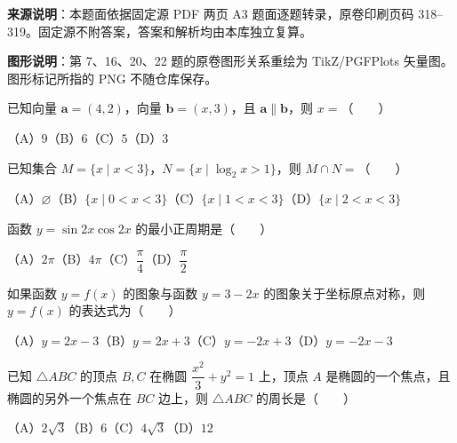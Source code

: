


\begin{gktip}
\textbf{来源说明}：本题面依据固定源 PDF 两页 A3 题面逐题转录，原卷印刷页码 318–319。固定源不附答案，答案和解析均由本库独立复算。

\textbf{图形说明}：第 7、16、20、22 题的原卷图形关系重绘为 TikZ/PGFPlots 矢量图。图形标记所指的 PNG 不随仓库保存。
\end{gktip}


\begin{question}
已知向量 $\boldsymbol a=(4,2)$，向量 $\boldsymbol b=(x,3)$，且 $\boldsymbol a\parallel\boldsymbol b$，则 $x=$\mbox{（　　）}

（A）$9$\quad（B）$6$\quad（C）$5$\quad（D）$3$

\end{question}
\begin{question}
已知集合 $M=\{x\mid x<3\}$，$N=\{x\mid\log_2x>1\}$，则 $M\cap N=$\mbox{（　　）}

（A）$\varnothing$\quad（B）$\{x\mid0<x<3\}$\quad（C）$\{x\mid1<x<3\}$\quad（D）$\{x\mid2<x<3\}$

\end{question}
\begin{question}
函数 $y=\sin2x\cos2x$ 的最小正周期是\mbox{（　　）}

（A）$2\pi$\quad（B）$4\pi$\quad（C）$\dfrac\pi4$\quad（D）$\dfrac\pi2$

\end{question}
\begin{question}
如果函数 $y=f(x)$ 的图象与函数 $y=3-2x$ 的图象关于坐标原点对称，则 $y=f(x)$ 的表达式为\mbox{（　　）}

（A）$y=2x-3$\quad（B）$y=2x+3$\quad（C）$y=-2x+3$\quad（D）$y=-2x-3$

\end{question}
\begin{question}
已知 $\triangle ABC$ 的顶点 $B,C$ 在椭圆 $\dfrac{x^2}{3}+y^2=1$ 上，顶点 $A$ 是椭圆的一个焦点，且椭圆的另外一个焦点在 $BC$ 边上，则 $\triangle ABC$ 的周长是\mbox{（　　）}

（A）$2\sqrt3$\quad（B）$6$\quad（C）$4\sqrt3$\quad（D）$12$

\end{question}
